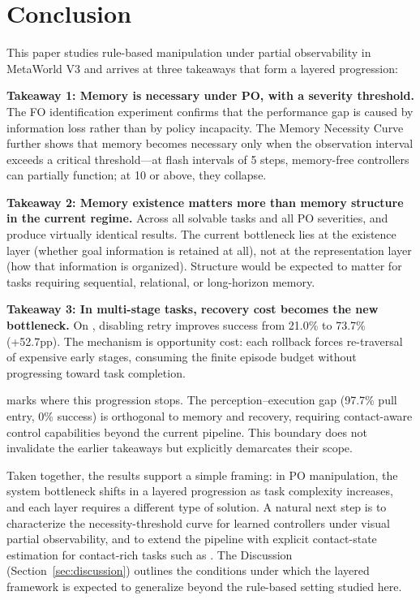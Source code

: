 \section{Conclusion}
\label{sec:conclusion}

This paper studies rule-based manipulation under partial observability in MetaWorld V3 and arrives at three takeaways that form a layered progression:

\textbf{Takeaway 1: Memory is necessary under PO, with a severity threshold.}
The FO identification experiment confirms that the performance gap is caused by information loss rather than by policy incapacity. The Memory Necessity Curve further shows that memory becomes necessary only when the observation interval exceeds a critical threshold---at flash intervals of 5 steps, memory-free controllers can partially function; at 10 or above, they collapse.

\textbf{Takeaway 2: Memory existence matters more than memory structure in the current regime.}
Across all solvable tasks and all PO severities,  and  produce virtually identical results. The current bottleneck lies at the existence layer (whether goal information is retained at all), not at the representation layer (how that information is organized). Structure would be expected to matter for tasks requiring sequential, relational, or long-horizon memory.

\textbf{Takeaway 3: In multi-stage tasks, recovery cost becomes the new bottleneck.}
On , disabling retry improves success from 21.0\% to 73.7\% (+52.7pp). The mechanism is opportunity cost: each rollback forces re-traversal of expensive early stages, consuming the finite episode budget without progressing toward task completion.

 marks where this progression stops. The perception--execution gap (97.7\% pull entry, 0\% success) is orthogonal to memory and recovery, requiring contact-aware control capabilities beyond the current pipeline. This boundary does not invalidate the earlier takeaways but explicitly demarcates their scope.

Taken together, the results support a simple framing: in PO manipulation, the system bottleneck shifts in a layered progression as task complexity increases, and each layer requires a different type of solution. A natural next step is to characterize the necessity-threshold curve for learned controllers under visual partial observability, and to extend the pipeline with explicit contact-state estimation for contact-rich tasks such as . The Discussion (Section~\ref{sec:discussion}) outlines the conditions under which the layered framework is expected to generalize beyond the rule-based setting studied here.
